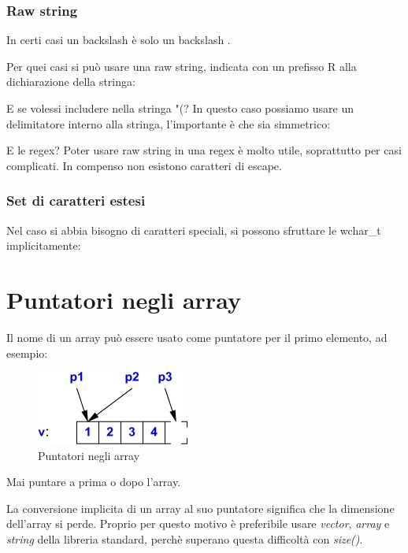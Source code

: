 \documentclass[11pt,a4paper]{book}
\begin{document}
\subsubsection{Raw string}
In certi casi un backslash è solo un backslash .

Per quei casi si può usare una raw string, indicata con un prefisso R alla dichiarazione della stringa:
\label{code: 086}

E se volessi includere nella stringa "(? In questo caso possiamo usare un delimitatore interno alla stringa, l'importante è che sia simmetrico:
\label{code: 087}

E le regex? Poter usare raw string in una regex è molto utile, soprattutto per casi complicati. In compenso non esistono caratteri di escape.

\subsubsection{Set di caratteri estesi}
Nel caso si abbia bisogno di caratteri speciali, si possono sfruttare le wchar\_t implicitamente:
\label{code: 088}

\section{Puntatori negli array}
Il nome di un array può essere usato come puntatore per il primo elemento, ad esempio:
\label{code: 089}
\begin{figure}[h!]
	\begin{center}
		\includegraphics[scale=0.6]{img/016.jpg}
		\caption{Puntatori negli array}
		\label{fig: 016}
	\end{center}
\end{figure}

Mai puntare a prima o dopo l'array.

La conversione implicita di un array al suo puntatore significa che la dimensione dell'array si perde. Proprio per questo motivo è preferibile usare \emph{vector}, \emph{array} e \emph{string} della libreria standard, perchè superano questa difficoltà con \emph{size()}.
\end{document}
